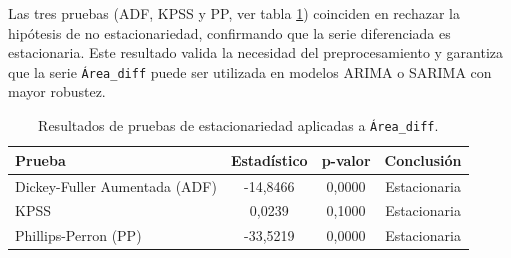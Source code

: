 Las tres pruebas (ADF, KPSS y PP, ver tabla \ref{tab:ru_area_diff}) coinciden en rechazar la hipótesis de no estacionariedad, 
confirmando que la serie diferenciada es estacionaria. Este resultado valida la 
necesidad del preprocesamiento y garantiza que la serie \texttt{Área\_diff} puede ser utilizada en 
modelos ARIMA o SARIMA con mayor robustez. 

\begin{table}[H]
    \centering
    \caption{Resultados de pruebas de estacionariedad aplicadas a \texttt{Área\_diff}.}
    \label{tab:ru_area_diff}
    \begin{tabular}{lccc}
        \toprule
        \textbf{Prueba} & \textbf{Estadístico} & \textbf{p-valor} & \textbf{Conclusión} \\
        \midrule
        Dickey-Fuller Aumentada (ADF) & -14,8466 & 0,0000 & Estacionaria \\
        KPSS & 0,0239 & 0,1000 & Estacionaria \\
        Phillips-Perron (PP) & -33,5219 & 0,0000 & Estacionaria \\
        \bottomrule
    \end{tabular}
\end{table}


